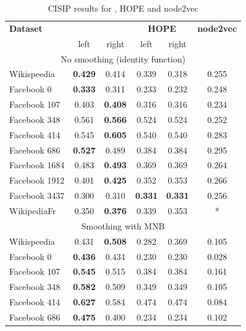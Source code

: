 \begin{table}[t]
\caption{CISIP results for \parfaite{}, HOPE and node2vec}
\begin{center}
\begin{tabular}{l|c|c|c|c|c}
\hline
\textbf{Dataset} & \multicolumn{2}{|c|}{\textbf{\parfaite{}}} & \multicolumn{2}{|c|}{\textbf{HOPE}} & \textbf{node2vec}\\
& left & right & left & right\\
\hline
\multicolumn{6}{c}{No smoothing (identity function)}\\
\hline
Wikispeedia  &  \textbf{0.429} & 0.414 & 0.339 & 0.318 & 0.255 \\
Facebook 0 & \textbf{0.333} & 0.311 & 0.233 & 0.232 & 0.248 \\
Facebook 107 & 0.403 & \textbf{0.408} & 0.316 & 0.316 & 0.234 \\
Facebook 348 & 0.561 & \textbf{0.566} & 0.524 & 0.524 & 0.252\\
Facebook 414 & 0.545 & \textbf{0.605} & 0.540 & 0.540 & 0.283\\
Facebook 686 & \textbf{0.527} & 0.489 & 0.384 & 0.384 & 0.295\\
Facebook 1684 & 0.483 & \textbf{0.493} & 0.369 & 0.369 & 0.264  \\
Facebook 1912 & 0.401 & \textbf{0.425} & 0.352 & 0.353 & 0.266\\
Facebook 3437 & 0.300 & 0.310 & \textbf{0.331} & \textbf{0.331} & 0.256\\
WikipediaFr  &  0.350 & \textbf{0.376} & 0.339 & 0.353 & *\\
\hline
\multicolumn{6}{c}{Smoothing with MNB}\\
\hline
Wikispeedia  &  0.431 & \textbf{0.508} & 0.282 & 0.369 & 0.105 \\
Facebook 0 & \textbf{0.436} & 0.434 & 0.230 & 0.230 & 0.028 \\
Facebook 107 & \textbf{0.545} & 0.515 & 0.384 & 0.384 & 0.161\\
Facebook 348 & \textbf{0.582} & 0.509 & 0.349 & 0.349 & 0.105\\
Facebook 414 & \textbf{0.627} & 0.584 & 0.474 & 0.474 & 0.084\\
Facebook 686 & \textbf{0.475} & 0.400 & 0.234 & 0.234 & 0.102\\

\end{tabular}
\end{center}
\end{table}
